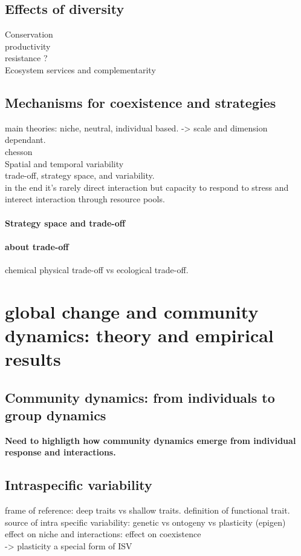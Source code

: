 \subsection{Effects of diversity}
Conservation\\
productivity\\
resistance ?\\
Ecosystem services and complementarity\\

\subsection{Mechanisms for coexistence and strategies}
main theories: niche, neutral, individual based. -> scale and dimension dependant.\\
chesson \cite{chesson_mechanisms_2000}\\
Spatial and temporal variability\\
trade-off, strategy space, and variability.\\
in the end it's rarely direct interaction but capacity to respond to stress and interect interaction through resource pools.

\paragraph{Strategy space and trade-off}

\paragraph{about trade-off}
chemical physical trade-off vs ecological trade-off.

\section{global change and community dynamics: theory and empirical results}

\subsection{Community dynamics: from individuals to group dynamics}
\textbf{Need to  highligth how community dynamics emerge from individual response and interactions.}

\subsection{Intraspecific variability}
frame of reference: deep traits vs shallow traits. definition of functional trait.\\
source of intra specific variability: genetic vs ontogeny vs plasticity (epigen) \\
effect on niche and interactions: effect on coexistence\\
-> plasticity a special form of ISV
